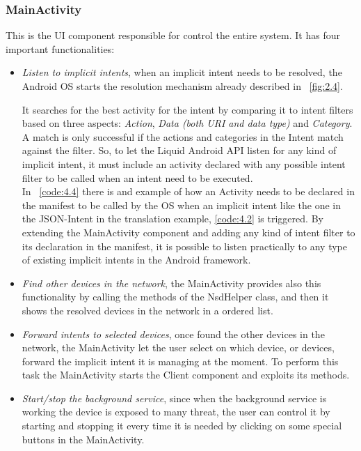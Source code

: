 \subsubsection{MainActivity}
This is the UI component responsible for control the entire system. It has four important functionalities:
\begin{itemize}
	\item \textit{Listen to implicit intents}, when an implicit intent needs to be resolved, the Android OS starts the resolution mechanism already described in \figurename~\ref{fig:2.4}.
	
	It searches for the best activity for the intent by comparing it to intent filters based on three aspects: \textit{Action}, \textit{Data (both URI and data type)} and \textit{Category}. A match is only successful if the actions and categories in the Intent match against the filter. So, to let the Liquid Android API listen for any kind of implicit intent, it must include an activity declared with any possible intent filter to be called when an intent need to be executed.\\
	In \lstlistingname~\ref{code:4.4} there is and example of how an Activity needs to be declared in the manifest to be called by the OS when an implicit intent like the one in the JSON-Intent in the translation example, \ref{code:4.2} is triggered.
	By extending the MainActivity component and adding any kind of intent filter to its declaration in the manifest, it is possible to listen practically to any type of existing implicit intents in the Android framework.
	\item \textit{Find other devices in the network}, the MainActivity provides also this functionality by calling the methods of the NsdHelper class, and then it shows the resolved devices in the network in a ordered list.
	\item \textit{Forward intents to selected devices}, once found the other devices in the network, the MainActivity let the user select on which device, or devices, forward the implicit intent it is managing at the moment. To perform this task the MainActivity starts the Client component and exploits its methods.
	\item \textit{Start/stop the background service}, since when the background service is working the device is exposed to many threat, the user can control it by starting and stopping it every time it is needed by clicking on some special buttons in the MainActivity. 
	
\end{itemize}

